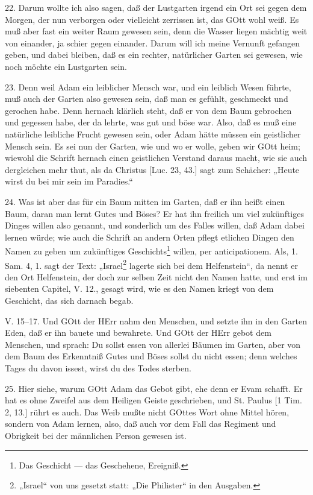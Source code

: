 22. Darum wollte ich also sagen, daß der Lustgarten irgend ein Ort sei gegen dem Morgen, der nun verborgen oder vielleicht zerrissen ist, das GOtt wohl weiß. Es muß aber fast ein weiter Raum gewesen sein, denn die Wasser liegen mächtig weit von einander, ja schier gegen einander. Darum will ich meine Vernunft gefangen geben, und dabei bleiben, daß es ein rechter, natürlicher Garten sei gewesen, wie noch möchte ein Lustgarten sein.

23. Denn weil Adam ein leiblicher Mensch war, und ein leiblich Wesen führte, muß auch der Garten also gewesen sein, daß man es gefühlt, geschmeckt und gerochen habe. Denn hernach klärlich steht, daß er von dem Baum gebrochen und gegessen habe, der da lehrte, was gut und böse war. Also, daß es muß eine natürliche leibliche Frucht gewesen sein, oder Adam hätte müssen ein geistlicher Mensch sein. Es sei nun der Garten, wie und wo er wolle, geben wir GOtt heim; wiewohl die Schrift hernach einen geistlichen Verstand daraus macht, wie sie auch dergleichen mehr thut, als da Christus [Luc. 23, 43.] sagt zum Schächer: „Heute wirst du bei mir sein im Paradies.“

24. Was ist aber das für ein Baum mitten im Garten, daß er ihn heißt einen Baum, daran man lernt Gutes und Böses? Er hat ihn freilich um viel zukünftiges Dinges willen also genannt, und sonderlich um des Falles willen, daß Adam dabei lernen würde; wie auch die Schrift an andern Orten pflegt etlichen Dingen den Namen zu geben um zukünftiges Geschichts\footnote{Das Geschicht — das Geschehene, Ereigniß.} willen, per anticipationem. Als, 1. Sam. 4, 1. sagt der Text: „Israel\footnote{„Israel“ von uns gesetzt statt: „Die Philister“ in den Ausgaben.} lagerte sich bei dem Helfenstein“, da nennt er den Ort Helfenstein, der doch zur selben Zeit nicht den Namen hatte, und erst im siebenten Capitel, V. 12., gesagt wird, wie es den Namen kriegt von dem Geschicht, das sich darnach begab.

\begin{schriftzitat}
V. 15–17. Und GOtt der HErr nahm den Menschen, und setzte ihn in den Garten Eden, daß er ihn bauete und bewahrete. Und GOtt der HErr gebot dem Menschen, und sprach: Du sollst essen von allerlei Bäumen im Garten, aber von dem Baum des Erkenntniß Gutes und Böses sollst du nicht essen; denn welches Tages du davon issest, wirst du des Todes sterben.
\end{schriftzitat}

25. Hier siehe, warum GOtt Adam das Gebot gibt, ehe denn er Evam schafft. Er hat es
ohne Zweifel aus dem Heiligen Geiste geschrieben, und St. Paulus [1 Tim. 2, 13.] rührt es auch. Das Weib mußte nicht GOttes Wort ohne Mittel hören, sondern von Adam lernen, also, daß auch vor dem Fall das Regiment und Obrigkeit bei der männlichen Person gewesen ist.

